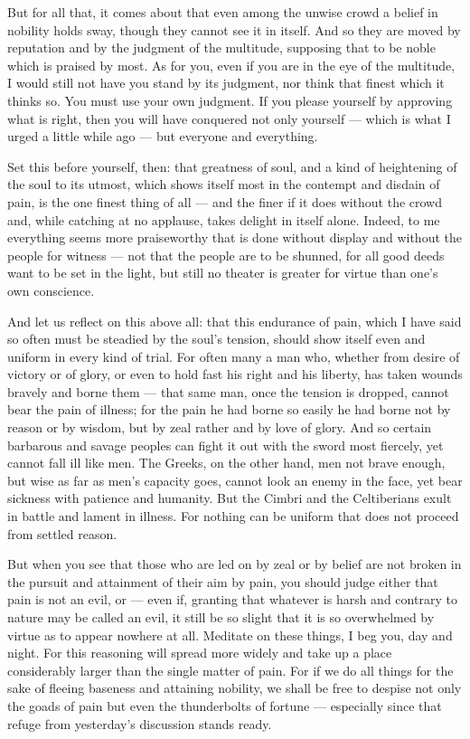  But for all that, it comes about that even among the unwise crowd a belief in nobility holds sway, though they cannot see it in itself. And so they are moved by reputation and by the judgment of the multitude, supposing that to be noble which is praised by most. As for you, even if you are in the eye of the multitude, I would still not have you stand by its judgment, nor think that finest which it thinks so. You must use your own judgment. If you please yourself by approving what is right, then you will have conquered not only yourself — which is what I urged a little while ago — but everyone and everything.

 Set this before yourself, then: that greatness of soul, and a kind of heightening of the soul to its utmost, which shows itself most in the contempt and disdain of pain, is the one finest thing of all — and the finer if it does without the crowd and, while catching at no applause, takes delight in itself alone. Indeed, to me everything seems more praiseworthy that is done without display and without the people for witness — not that the people are to be shunned, for all good deeds want to be set in the light, but still no theater is greater for virtue than one's own conscience.

 And let us reflect on this above all: that this endurance of pain, which I have said so often must be steadied by the soul's tension, should show itself even and uniform in every kind of trial. For often many a man who, whether from desire of victory or of glory, or even to hold fast his right and his liberty, has taken wounds bravely and borne them — that same man, once the tension is dropped, cannot bear the pain of illness; for the pain he had borne so easily he had borne not by reason or by wisdom, but by zeal rather and by love of glory. And so certain barbarous and savage peoples can fight it out with the sword most fiercely, yet cannot fall ill like men. The Greeks, on the other hand, men not brave enough, but wise as far as men's capacity goes, cannot look an enemy in the face, yet bear sickness with patience and humanity. But the Cimbri and the Celtiberians exult in battle and lament in illness. For nothing can be uniform that does not proceed from settled reason.

 But when you see that those who are led on by zeal or by belief are not broken in the pursuit and attainment of their aim by pain, you should judge either that pain is not an evil, or — even if, granting that whatever is harsh and contrary to nature may be called an evil, it still be so slight that it is so overwhelmed by virtue as to appear nowhere at all. Meditate on these things, I beg you, day and night. For this reasoning will spread more widely and take up a place considerably larger than the single matter of pain. For if we do all things for the sake of fleeing baseness and attaining nobility, we shall be free to despise not only the goads of pain but even the thunderbolts of fortune — especially since that refuge from yesterday's discussion stands ready.

